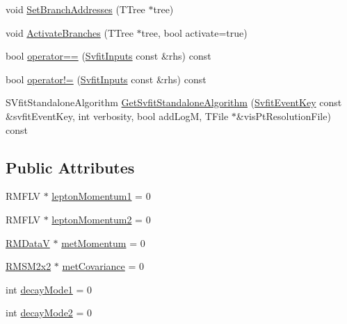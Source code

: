 \begin{DoxyCompactItemize}
\item 
void \hyperlink{classSvfitInputs_a7f8739a7ff2404d7e7cf323f537c4d64}{SetBranchAddresses} (TTree $\ast$tree)
\item 
void \hyperlink{classSvfitInputs_af56198966e4b7c1eca905a31acf586c4}{ActivateBranches} (TTree $\ast$tree, bool activate=true)
\item 
bool \hyperlink{classSvfitInputs_a4cd441c132a0b81fa8897da201e7ffba}{operator==} (\hyperlink{classSvfitInputs}{SvfitInputs} const \&rhs) const 
\item 
bool \hyperlink{classSvfitInputs_aaab59815bf07360974d7595daa4d33b9}{operator!=} (\hyperlink{classSvfitInputs}{SvfitInputs} const \&rhs) const 
\item 
SVfitStandaloneAlgorithm \hyperlink{classSvfitInputs_aa89032ea9c7ace07c00243dab364a602}{GetSvfitStandaloneAlgorithm} (\hyperlink{classSvfitEventKey}{SvfitEventKey} const \&svfitEventKey, int verbosity, bool addLogM, TFile $\ast$\&visPtResolutionFile) const 
\end{DoxyCompactItemize}
\subsection*{Public Attributes}
\begin{DoxyCompactItemize}
\item 
RMFLV $\ast$ \hyperlink{classSvfitInputs_a8cbce6801e4e0ed5a0a376ab13e04697}{leptonMomentum1} = 0
\item 
RMFLV $\ast$ \hyperlink{classSvfitInputs_a16b08513227e966888b217e115b1f3e9}{leptonMomentum2} = 0
\item 
\hyperlink{SvfitTools_8h_aaf454bd335994d52523052c77c343e3d}{RMDataV} $\ast$ \hyperlink{classSvfitInputs_ace5d904fc75fdff3f820bfc9d67fb87c}{metMomentum} = 0
\item 
\hyperlink{SvfitTools_8h_a80fdad30ecf55d29d315471eb3595acd}{RMSM2x2} $\ast$ \hyperlink{classSvfitInputs_ae09cccb51b5186fd72eb03eae338f131}{metCovariance} = 0
\item 
int \hyperlink{classSvfitInputs_a784625a886909f4f9743c72f9780ccc5}{decayMode1} = 0
\item 
int \hyperlink{classSvfitInputs_a667f1b15f6955a9a40929e9f670eabea}{decayMode2} = 0
\end{DoxyCompactItemize}


